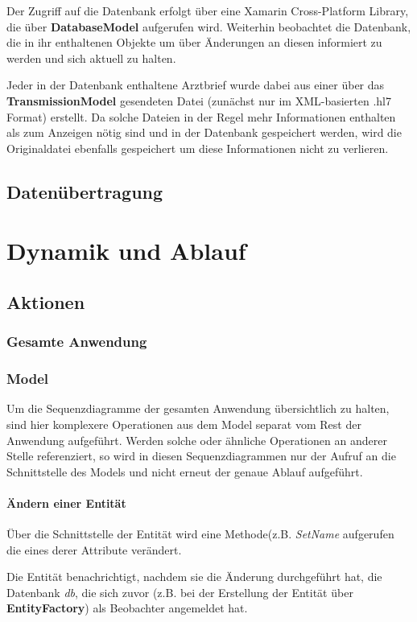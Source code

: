 \documentclass[a4paper]{scrreprt}
\begin{document}
Der Zugriff auf die Datenbank erfolgt über eine Xamarin Cross-Platform Library, die über \textbf{DatabaseModel} aufgerufen wird. Weiterhin beobachtet die Datenbank, die in ihr enthaltenen Objekte um über Änderungen an diesen informiert zu werden und sich aktuell zu halten.

Jeder in der Datenbank enthaltene Arztbrief wurde dabei aus einer über das \textbf{TransmissionModel}
gesendeten Datei (zunächst nur im XML-basierten .hl7 Format) erstellt. Da solche Dateien in der Regel mehr Informationen enthalten als zum Anzeigen nötig sind und in der Datenbank gespeichert werden, wird die Originaldatei ebenfalls gespeichert um diese Informationen nicht zu verlieren.

\section{Datenübertragung}

\chapter{Dynamik und Ablauf}
\section{Aktionen}
\subsection{Gesamte Anwendung}

\subsection{Model}
Um die Sequenzdiagramme der gesamten Anwendung übersichtlich zu halten, sind hier komplexere Operationen aus dem Model separat vom Rest der Anwendung aufgeführt. Werden solche oder ähnliche Operationen an anderer Stelle referenziert, so wird in diesen Sequenzdiagrammen nur der Aufruf an die Schnittstelle des Models und nicht erneut der genaue Ablauf aufgeführt.
 
\subsubsection{Ändern einer Entität}
Über die Schnittstelle der Entität wird eine Methode(z.B. \textit{SetName} aufgerufen die eines derer Attribute verändert.

Die Entität benachrichtigt, nachdem sie die Änderung durchgeführt hat, die Datenbank \textit{db}, die sich zuvor (z.B. bei der Erstellung der Entität über \textbf{EntityFactory}) als Beobachter angemeldet hat.
\end{document}
